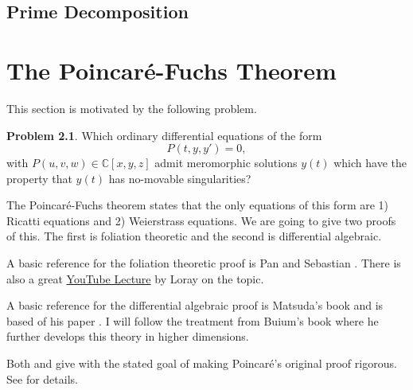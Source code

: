 \documentclass[12pt]{book}
\numberwithin{equation}{section}
\theoremstyle{definition}
\newtheorem{problem}[theorem]{Problem}
\theoremstyle{remark}
\newcommand{\CC}{\mathbb{C}}
\begin{document}
\section{Prime Decomposition}



 
\chapter[Poincar\'{e}-Fuchs]{The Poincar\'{e}-Fuchs Theorem}

This section is motivated by the following problem.
\begin{problem}
Which ordinary differential equations of the form
	  $$ P(t,y,y') =0, $$
with $P(u,v,w) \in \CC[x,y,z]$ admit meromorphic solutions $y(t)$ which have the property that $y(t)$ has no-movable singularities? 
\end{problem}
The Poincar\'e-Fuchs theorem states that the only equations of this form are 1) Ricatti equations and 2) Weierstrass equations. 
We are going to give two proofs of this. 
The first is foliation theoretic and the second is differential algebraic. 

A basic reference for the foliation theoretic proof is Pan and Sebastian \cite{Pan2004}.
There is also a great \href{https://www.youtube.com/watch?v=DoCCm8zjvXQ&list=PL0E0n75oNCDk5tuV-t2_K56sEfLd0Od8H&index=21}{YouTube Lecture} by Loray on the topic. 

A basic reference for the differential algebraic proof is Matsuda's book \cite{Matsuda1980} and is based of his paper \cite{Matsuda1978}.
I will follow the treatment from Buium's book \cite{Buium1986} where he further develops this theory in higher dimensions.

Both \cite{Pan2004} and \cite{Matsuda1978} give with the stated goal of making Poincar\'e's original proof rigorous. 
See \cite{Matsuda1978} for details.





\end{document}
